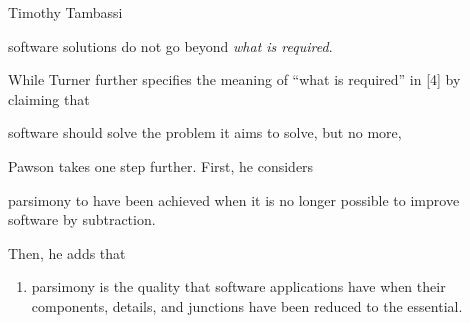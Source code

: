\begin{artengenv}{Timothy Tambassi}
\setcounter{saveenumtambassi}{\value{enumi}}

\begin{enumerate}[label={[\arabic*]}]

\setcounter{enumi}{\value{saveenumtambassi}}

\item software solutions do not go beyond \textit{what is required}.

\end{enumerate}

While Turner further specifies the meaning of ``what is required'' in [4] by claiming that



\setcounter{saveenumtambassi}{\value{enumi}}

\begin{enumerate}[label={[\arabic*]}]

\setcounter{enumi}{\value{saveenumtambassi}}

\item software should solve the problem it aims to solve, but no more,

\end{enumerate}

Pawson 
\parencite*[][]{pawson_minimum_1998} %
 takes one step further. First, he considers



\setcounter{saveenumtambassi}{\value{enumi}}

\begin{enumerate}[label={[\arabic*]}]

\setcounter{enumi}{\value{saveenumtambassi}}

\item parsimony to have been achieved when it is no longer possible to improve software by subtraction.

\end{enumerate}

Then, he adds that

\enlargethispage{1.5\baselineskip}

\setcounter{saveenumtambassi}{\value{enumi}}

\begin{enumerate}

\setcounter{enumi}{\value{saveenumtambassi}}

\item parsimony is the quality that software applications have when their components, details, and junctions have been reduced to the essential.


\end{enumerate}
\end{artengenv}
